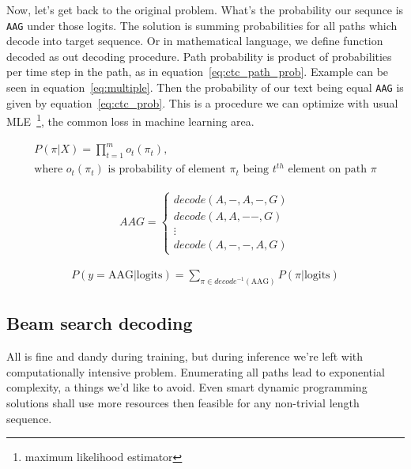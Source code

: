 \documentclass[times, utf8, diplomski, english]{fer}
\begin{document}
Now, let's get back to the original problem. What's the probability our sequnce is \texttt{AAG} under those logits. 
The solution is summing probabilities for all paths which decode into target sequence. 
Or in mathematical language, we define function decoded as out decoding procedure. 
Path probability is product of probabilities per time step in the path, as in equation~\ref{eq:ctc_path_prob}.
Example can be seen in equation~\ref{eq:multiple}. 
Then the probability of our text being equal \texttt{AAG} is given by equation~\ref{eq:ctc_prob}.
This is a procedure we can optimize with usual MLE~\footnote{maximum likelihood estimator}, the common loss in machine learning area.

\begin{equation}
\begin{gathered}
\label{eq:ctc_path_prob}
P(\pi | X) = \prod_{t=1}^{m} o_t(\pi_t), \\
\text{where $o_t(\pi_t)$ is probability of element $\pi_t$ being $t^{th}$ element on path $\pi$}
\end{gathered}
\end{equation}

\begin{equation}
\begin{gathered}
\label{eq:multiple}
AAG = \begin{cases}
decode(A, -, A, -, G) \\
decode(A, A, - -, G) \\
\vdots \\
decode(A, -, -, A, G) 
\end{cases}
\end{gathered}
\end{equation}

\begin{equation}
\begin{gathered}
\label{eq:ctc_prob}
P(y = \text{AAG}| \text{logits}) = \sum_{\pi \in decode^{-1}(\text{AAG})} P(\pi | \text{logits})
\end{gathered}
\end{equation}

\subsection{Beam search decoding}
\label{subsec:beam-search}

All is fine and dandy during training, but during inference we're left with computationally intensive problem. Enumerating all paths lead to exponential complexity, a things we'd like to avoid. Even smart dynamic programming solutions shall use more resources then feasible for any non-trivial length sequence. 
\end{document}
